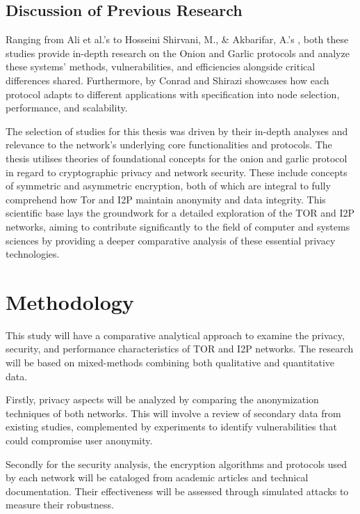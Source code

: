 \documentclass[12pt,conference]{IEEEtran}
\begin{document}
\subsection{Discussion of Previous Research}
Ranging from Ali et al.'s  \cite{TORVsI2P} to Hosseini Shirvani, M., \& Akbarifar, A.'s  \cite{aComparativeStudyOnAnonymizingNetworks}, both these studies provide in-depth research on the Onion and Garlic protocols and analyze these systems’ methods, vulnerabilities, and efficiencies alongside critical differences shared. Furthermore,  by Conrad and Shirazi \cite{aSurveyOnTORAndI2P} showcases how each protocol adapts to different applications with specification into node selection, performance, and scalability. 

The selection of studies for this thesis was driven by their in-depth analyses and relevance to the network's underlying core functionalities and protocols. The thesis utilises theories of foundational concepts for the onion and garlic protocol in regard to cryptographic privacy and network security. These include concepts of symmetric and asymmetric encryption, both of which are integral to fully comprehend how Tor and I2P maintain anonymity and data integrity. This scientific base lays the groundwork for a detailed exploration of the TOR and I2P networks, aiming to contribute significantly to the field of computer and systems sciences by providing a deeper comparative analysis of these essential privacy technologies.


\section{Methodology}
This study will have a comparative analytical approach to examine the privacy, security, and performance characteristics of TOR and I2P networks. The research will be based on mixed-methods combining both qualitative and quantitative data. 

Firstly, privacy aspects will be analyzed by comparing the anonymization techniques of both networks. This will involve a review of secondary data from existing studies, complemented by experiments to identify vulnerabilities that could compromise user anonymity. 

Secondly for the security analysis, the encryption algorithms and protocols used by each network will be cataloged from academic articles and technical documentation. Their effectiveness will be assessed through simulated attacks to measure their robustness.
\end{document}
